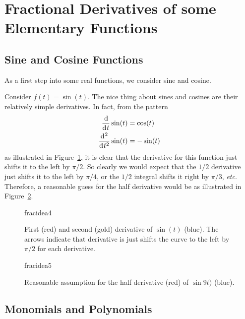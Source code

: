 \section{Fractional Derivatives of some Elementary Functions}
\subsection{Sine and Cosine Functions}
As a first step into some real functions, we consider sine and cosine.

\begin{example}
  Consider $f(t) = \sin(t)$. The nice thing about sines and cosines are their relatively simple derivatives. In fact, from the pattern
  \begin{align*}
    \frac{\operatorname{d}\hspace*{-1pt}}{\operatorname{d}\hspace*{-1pt} t} \sin(t) &= \cos(t) \\
    \frac{\operatorname{d}\hspace*{-1pt}^2}{\operatorname{d}\hspace*{-1pt} t^2} \sin(t) &= -\sin(t)
  \end{align*}
  as illustrated in Figure~\ref{fig:fracidea4}, it is clear that the derivative for this function just shifts it to the left by $\pi/2$. So clearly we would expect that the $1/2$ derivative just shifts it to the left by $\pi/4$, or the $1/2$ integral shifts it right by $\pi/3$, \textit{etc}. Therefore, a reasonable guess for the half derivative would be as illustrated in Figure~\ref{fig:fracidea5}.

  \begin{figure}
    \centering
    {fracidea4}
    \caption{First (red) and second (gold) derivative of $\sin(t)$ (blue). The arrows indicate that derivative is just shifts the curve to the left by $\pi/2$ for each derivative.}
    \label{fig:fracidea4}
  \end{figure}

  \begin{figure}
    \centering
    {fracidea5}
  \caption{Reasonable assumption for the half derivative (red) of $\sin9t)$ (blue).}
  \label{fig:fracidea5}
\end{figure}

\end{example}

\subsection{Monomials and Polynomials}

